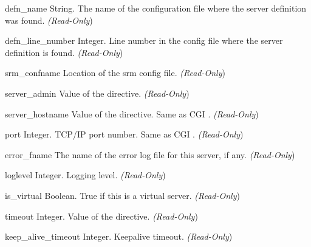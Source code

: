 \begin{memberdesc}[server]{defn_name}
String. The name of the configuration file where the server definition
was found.
\emph{(Read-Only})
\end{memberdesc}

\begin{memberdesc}[server]{defn_line_number}
Integer. Line number in the config file where the server definition is
found.
\emph{(Read-Only})
\end{memberdesc}

\begin{memberdesc}[server]{srm_confname}
Location of the srm config file.
\emph{(Read-Only})
\end{memberdesc}

\begin{memberdesc}[server]{server_admin}
Value of the  directive. 
\emph{(Read-Only})
\end{memberdesc}

\begin{memberdesc}[server]{server_hostname}
Value of the  directive. Same as CGI .
\emph{(Read-Only})
\end{memberdesc}

\begin{memberdesc}[server]{port}
Integer. TCP/IP port number. Same as CGI .
\emph{(Read-Only})
\end{memberdesc}

\begin{memberdesc}[server]{error_fname}
The name of the error log file for this server, if any.
\emph{(Read-Only})
\end{memberdesc}

\begin{memberdesc}[server]{loglevel}
Integer. Logging level.
\emph{(Read-Only})
\end{memberdesc}

\begin{memberdesc}[server]{is_virtual}
Boolean. True if this is a virtual server.
\emph{(Read-Only})
\end{memberdesc}

\begin{memberdesc}[server]{timeout}
Integer. Value of the  directive.
\emph{(Read-Only})
\end{memberdesc}

\begin{memberdesc}[server]{keep_alive_timeout}
Integer. Keepalive timeout.
\emph{(Read-Only})
\end{memberdesc}

